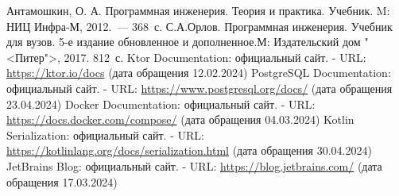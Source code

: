 \begin{thebibliography}{00}
	\bibitem{} Антамошкин, О. А. Программная инженерия. Теория и практика.
		Учебник. M: НИЦ Инфра-М, 2012.~--- 368~с.
	\bibitem{} С.А.Орлов. Программная инженерия.
		Учебник для вузов. 5-е издание обновленное и дополненное.М:
		Издательский дом "<Питер">, 2017. 812~с.
	\bibitem{} Ktor Documentation: официальный сайт.
		- URL: \url{https://ktor.io/docs} (дата обращения 12.02.2024)
	\bibitem{} PostgreSQL Documentation: официальный сайт.
		- URL: \url{https://www.postgresql.org/docs/} (дата обращения 23.04.2024)
	\bibitem{} Docker Documentation: официальный сайт.
		- URL: \url{https://docs.docker.com/compose/} (дата обращения 04.03.2024)
	\bibitem{} Kotlin Serialization: официальный сайт.
		- URL: \url{https://kotlinlang.org/docs/serialization.html} (дата обращения 30.04.2024)
	\bibitem{} JetBrains Blog: официальный сайт.
		- URL: \url{https://blog.jetbrains.com/} (дата обращения 17.03.2024)

\end{thebibliography}


